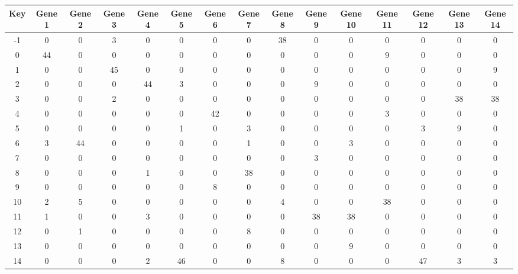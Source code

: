 \begin{tabular}{|c|c|c|c|c|c|c|c|c|c|c|c|c|c|c|}
\hline
Key & Gene 1 & Gene 2 & Gene 3 & Gene 4 & Gene 5 & Gene 6 & Gene 7 & Gene 8 & Gene 9 & Gene 10 & Gene 11 & Gene 12 & Gene 13 & Gene 14 \\
\hline
-1 & 0 & 0 & 3 & 0 & 0 & 0 & 0 & 38 & 0 & 0 & 0 & 0 & 0 & 0 \\
0 & 44 & 0 & 0 & 0 & 0 & 0 & 0 & 0 & 0 & 0 & 9 & 0 & 0 & 0 \\
1 & 0 & 0 & 45 & 0 & 0 & 0 & 0 & 0 & 0 & 0 & 0 & 0 & 0 & 9 \\
2 & 0 & 0 & 0 & 44 & 3 & 0 & 0 & 0 & 9 & 0 & 0 & 0 & 0 & 0 \\
3 & 0 & 0 & 2 & 0 & 0 & 0 & 0 & 0 & 0 & 0 & 0 & 0 & 38 & 38 \\
4 & 0 & 0 & 0 & 0 & 0 & 42 & 0 & 0 & 0 & 0 & 3 & 0 & 0 & 0 \\
5 & 0 & 0 & 0 & 0 & 1 & 0 & 3 & 0 & 0 & 0 & 0 & 3 & 9 & 0 \\
6 & 3 & 44 & 0 & 0 & 0 & 0 & 1 & 0 & 0 & 3 & 0 & 0 & 0 & 0 \\
7 & 0 & 0 & 0 & 0 & 0 & 0 & 0 & 0 & 3 & 0 & 0 & 0 & 0 & 0 \\
8 & 0 & 0 & 0 & 1 & 0 & 0 & 38 & 0 & 0 & 0 & 0 & 0 & 0 & 0 \\
9 & 0 & 0 & 0 & 0 & 0 & 8 & 0 & 0 & 0 & 0 & 0 & 0 & 0 & 0 \\
10 & 2 & 5 & 0 & 0 & 0 & 0 & 0 & 4 & 0 & 0 & 38 & 0 & 0 & 0 \\
11 & 1 & 0 & 0 & 3 & 0 & 0 & 0 & 0 & 38 & 38 & 0 & 0 & 0 & 0 \\
12 & 0 & 1 & 0 & 0 & 0 & 0 & 8 & 0 & 0 & 0 & 0 & 0 & 0 & 0 \\
13 & 0 & 0 & 0 & 0 & 0 & 0 & 0 & 0 & 0 & 9 & 0 & 0 & 0 & 0 \\
14 & 0 & 0 & 0 & 2 & 46 & 0 & 0 & 8 & 0 & 0 & 0 & 47 & 3 & 3 \\
\hline
\end{tabular}